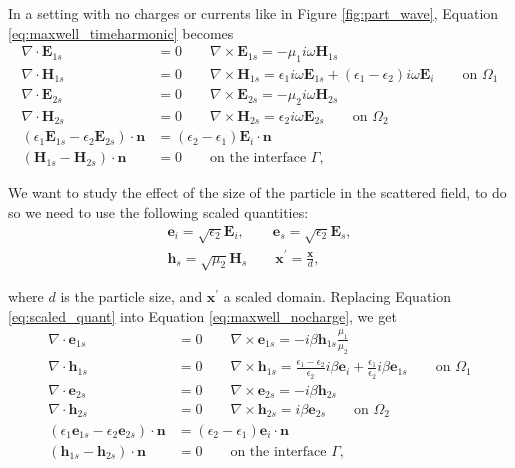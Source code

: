 In a setting with no charges or currents like in Figure \ref{fig:part_wave}, Equation \eqref{eq:maxwell_timeharmonic} becomes
 \begin{align} \label{eq:maxwell_nocharge}
 \nabla \cdot \mathbf{E}_{1s} &= 0 \qquad \nabla \times \mathbf{E}_{1s} = -\mu_1i\omega\mathbf{H}_{1s} \nonumber \\
 \nabla \cdot \mathbf{H}_{1s} &= 0 \qquad \nabla \times \mathbf{H}_{1s} = \epsilon_1i\omega\mathbf{E}_{1s} + (\epsilon_1-\epsilon_2)i\omega\mathbf{E}_{i} \qquad \text{on $\Omega_1$} \nonumber \\
 \nabla \cdot \mathbf{E}_{2s} &= 0 \qquad \nabla \times \mathbf{E}_{2s} = -\mu_2i\omega\mathbf{H}_{2s} \nonumber \\
 \nabla \cdot \mathbf{H}_{2s} &= 0 \qquad \nabla \times \mathbf{H}_{2s} = \epsilon_2i\omega\mathbf{E}_{2s} \qquad \text{on $\Omega_2$} \nonumber \\
 (\epsilon_1\mathbf{E}_{1s} - \epsilon_2\mathbf{E}_{2s})\cdot\mathbf{n} &= (\epsilon_2-\epsilon_1)\mathbf{E}_i\cdot \mathbf{n} \nonumber \\(\mathbf{H}_{1s} - \mathbf{H}_{2s})\cdot \mathbf{n}&=0 \qquad \text{on the interface $\Gamma$,}
 \end{align}
 
 We want to study the effect of the size of the particle in the scattered field, to do so we need 
 to use the following scaled quantities:
 \begin{align}\label{eq:scaled_quant}
 \mathbf{e}_i = \sqrt{\epsilon_2}\mathbf{E}_i, \qquad \mathbf{e}_s = \sqrt{\epsilon_2}\mathbf{E}_s, \nonumber \\
 \mathbf{h}_s = \sqrt{\mu_2}\mathbf{H}_s \qquad \mathbf{x}^\prime = \frac{\mathbf{x}}{d},
 \end{align}
 
 where $d$ is the particle size, and $\mathbf{x}^\prime$ a scaled domain. Replacing 
 Equation \eqref{eq:scaled_quant} into Equation \eqref{eq:maxwell_nocharge}, we get
 \begin{align} \label{eq:maxwell_scaled}
 \nabla \cdot \mathbf{e}_{1s} &= 0 \qquad \nabla \times \mathbf{e}_{1s} = -i\beta\mathbf{h}_{1s}\frac{\mu_1}{\mu_2} \nonumber \\
 \nabla \cdot \mathbf{h}_{1s} &= 0 \qquad \nabla \times \mathbf{h}_{1s} = \frac{\epsilon_1-\epsilon_2}{\epsilon_2}i\beta\mathbf{e}_{i}+\frac{\epsilon_1}{\epsilon_2}i\beta\mathbf{e}_{1s}  \qquad \text{on $\Omega_1$} \nonumber \\
 \nabla \cdot \mathbf{e}_{2s} &= 0 \qquad \nabla \times \mathbf{e}_{2s} = -i\beta\mathbf{h}_{2s} \nonumber \\
 \nabla \cdot \mathbf{h}_{2s} &= 0 \qquad \nabla \times \mathbf{h}_{2s} = i\beta\mathbf{e}_{2s} \qquad \text{on $\Omega_2$} \nonumber \\
 (\epsilon_1\mathbf{e}_{1s} - \epsilon_2\mathbf{e}_{2s})\cdot\mathbf{n} &= (\epsilon_2-\epsilon_1)\mathbf{e}_i\cdot \mathbf{n} \nonumber \\(\mathbf{h}_{1s} - \mathbf{h}_{2s})\cdot \mathbf{n}&=0 \qquad \text{on the interface $\Gamma$,}
 \end{align}
 
